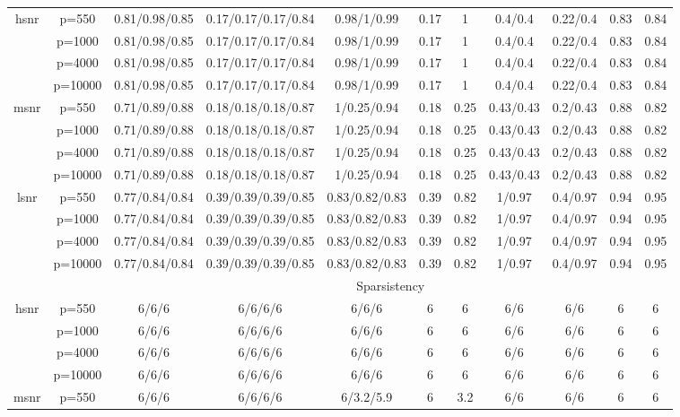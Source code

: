 \begin{table}[ht]
{\begin{tabular}{|c|c|ccccccccc|}
\midrule\multirow{4}[2]{*}{hsnr} & p=550 & 0.81/0.98/0.85 & 0.17/0.17/0.17/0.84 & 0.98/1/0.99 & 0.17 & 1 & 0.4/0.4 & 0.22/0.4 & 0.83 & 0.84 \\ 
   & p=1000 & 0.81/0.98/0.85 & 0.17/0.17/0.17/0.84 & 0.98/1/0.99 & 0.17 & 1 & 0.4/0.4 & 0.22/0.4 & 0.83 & 0.84 \\ 
   & p=4000 & 0.81/0.98/0.85 & 0.17/0.17/0.17/0.84 & 0.98/1/0.99 & 0.17 & 1 & 0.4/0.4 & 0.22/0.4 & 0.83 & 0.84 \\ 
   & p=10000 & 0.81/0.98/0.85 & 0.17/0.17/0.17/0.84 & 0.98/1/0.99 & 0.17 & 1 & 0.4/0.4 & 0.22/0.4 & 0.83 & 0.84 \\ 
  \midrule\multirow{4}[2]{*}{msnr} & p=550 & 0.71/0.89/0.88 & 0.18/0.18/0.18/0.87 & 1/0.25/0.94 & 0.18 & 0.25 & 0.43/0.43 & 0.2/0.43 & 0.88 & 0.82 \\ 
   & p=1000 & 0.71/0.89/0.88 & 0.18/0.18/0.18/0.87 & 1/0.25/0.94 & 0.18 & 0.25 & 0.43/0.43 & 0.2/0.43 & 0.88 & 0.82 \\ 
   & p=4000 & 0.71/0.89/0.88 & 0.18/0.18/0.18/0.87 & 1/0.25/0.94 & 0.18 & 0.25 & 0.43/0.43 & 0.2/0.43 & 0.88 & 0.82 \\ 
   & p=10000 & 0.71/0.89/0.88 & 0.18/0.18/0.18/0.87 & 1/0.25/0.94 & 0.18 & 0.25 & 0.43/0.43 & 0.2/0.43 & 0.88 & 0.82 \\ 
  \midrule\multirow{4}[2]{*}{lsnr} & p=550 & 0.77/0.84/0.84 & 0.39/0.39/0.39/0.85 & 0.83/0.82/0.83 & 0.39 & 0.82 & 1/0.97 & 0.4/0.97 & 0.94 & 0.95 \\ 
   & p=1000 & 0.77/0.84/0.84 & 0.39/0.39/0.39/0.85 & 0.83/0.82/0.83 & 0.39 & 0.82 & 1/0.97 & 0.4/0.97 & 0.94 & 0.95 \\ 
   & p=4000 & 0.77/0.84/0.84 & 0.39/0.39/0.39/0.85 & 0.83/0.82/0.83 & 0.39 & 0.82 & 1/0.97 & 0.4/0.97 & 0.94 & 0.95 \\ 
   & p=10000 & 0.77/0.84/0.84 & 0.39/0.39/0.39/0.85 & 0.83/0.82/0.83 & 0.39 & 0.82 & 1/0.97 & 0.4/0.97 & 0.94 & 0.95 \\ 
   \midrule 
 \multicolumn{1}{|c}{} &       & \multicolumn{9}{c|}{Sparsistency} \\
\midrule\multirow{4}[2]{*}{hsnr} & p=550 & 6/6/6 & 6/6/6/6 & 6/6/6 & 6 & 6 & 6/6 & 6/6 & 6 & 6 \\ 
   & p=1000 & 6/6/6 & 6/6/6/6 & 6/6/6 & 6 & 6 & 6/6 & 6/6 & 6 & 6 \\ 
   & p=4000 & 6/6/6 & 6/6/6/6 & 6/6/6 & 6 & 6 & 6/6 & 6/6 & 6 & 6 \\ 
   & p=10000 & 6/6/6 & 6/6/6/6 & 6/6/6 & 6 & 6 & 6/6 & 6/6 & 6 & 6 \\ 
  \midrule\multirow{4}[2]{*}{msnr} & p=550 & 6/6/6 & 6/6/6/6 & 6/3.2/5.9 & 6 & 3.2 & 6/6 & 6/6 & 6 & 6 \\ 

\end{tabular}}
\end{table}
